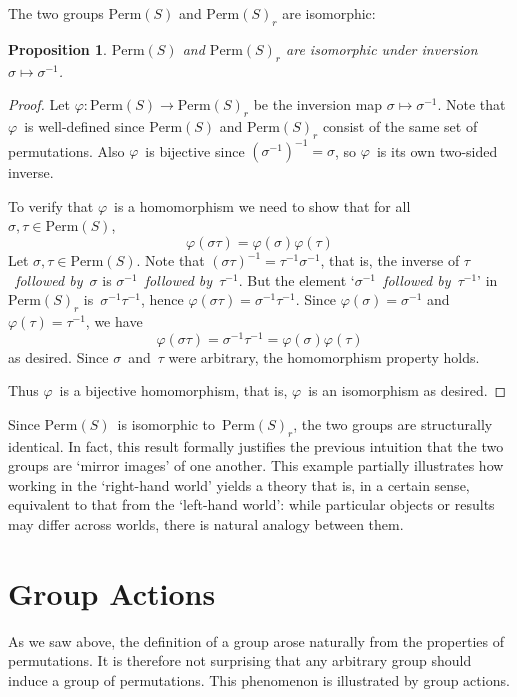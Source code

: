 \documentclass[letterpaper]{article}
\theoremstyle{definition}
\theoremstyle{plain}
\newtheorem*{prop}{Proposition}
\newcommand{\perm}[1]{\mathrm{Perm}({#1})}
\begin{document}
The two groups $\perm{S}$ and $\perm{S}_r$ are isomorphic:
\goodbreak
\begin{prop}
$\perm{S}$ and $\perm{S}_r$ are isomorphic under inversion $\sigma\mapsto\sigma^{-1}$.
\end{prop}
\begin{proof}
Let $\varphi:\perm{S}\to\perm{S}_r$ be the inversion map $\sigma\mapsto\sigma^{-1}$. Note that $\varphi$~is well-defined since $\perm{S}$ and $\perm{S}_r$ consist of the same set of permutations. Also $\varphi$~is bijective since $(\sigma^{-1})^{-1}=\sigma$, so $\varphi$~is its own two-sided inverse.

To verify that $\varphi$~is a homomorphism we need to show that for all $\sigma,\tau\in\perm{S}$,
$$\varphi(\sigma\tau)=\varphi(\sigma)\varphi(\tau)$$
Let $\sigma,\tau\in\perm{S}$. Note that $(\sigma\tau)^{-1}=\tau^{-1}\sigma^{-1}$, that is, the inverse of \emph{$\tau$~followed by~$\sigma$} is \emph{$\sigma^{-1}$~followed by~$\tau^{-1}$}. But the element `\emph{$\sigma^{-1}$~followed by~$\tau^{-1}$}' in~$\perm{S}_r$ is~$\sigma^{-1}\tau^{-1}$, hence $\varphi(\sigma\tau)=\sigma^{-1}\tau^{-1}$. Since $\varphi(\sigma)=\sigma^{-1}$ and $\varphi(\tau)=\tau^{-1}$, we have
$$\varphi(\sigma\tau)=\sigma^{-1}\tau^{-1}=\varphi(\sigma)\varphi(\tau)$$
as desired. Since $\sigma$~and~$\tau$ were arbitrary, the homomorphism property holds.

Thus $\varphi$~is a bijective homomorphism, that is, $\varphi$~is an isomorphism as desired.
\end{proof}
\noindent Since $\perm{S}$~is isomorphic to~$\perm{S}_r$, the two groups are structurally identical. In fact, this result formally justifies the previous intuition that the two groups are `mirror images' of one another. This example partially illustrates how working in the `right-hand world' yields a theory that is, in a certain sense, equivalent to that from the `left-hand world': while particular objects or results may differ across worlds, there is natural analogy between them.

\section*{Group Actions}
As we saw above, the definition of a group arose naturally from the properties of permutations. It is therefore not surprising that any arbitrary group should induce a group of permutations. This phenomenon is illustrated by group actions.
\end{document}
